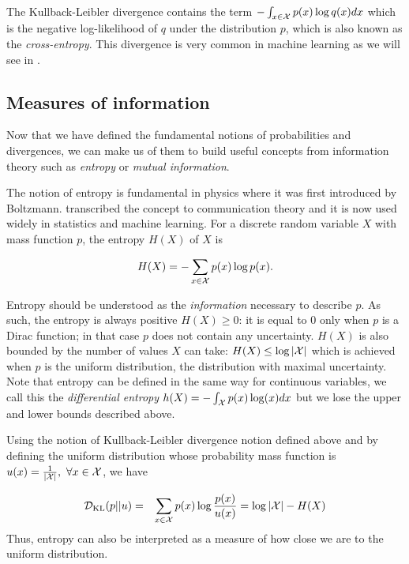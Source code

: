 The Kullback-Leibler divergence contains the term $-\int_{x \in {\mathcal{X}}}  p(x) \log q(x) dx$ which is the negative log-likelihood of $q$ under the distribution $p$, which is also known as the \emph{cross-entropy}. This divergence is very common in machine learning as we will see in .

\subsection{Measures of information}
Now that we have defined the fundamental notions of probabilities and divergences, we can make us of them to build useful concepts from information theory such as \emph{entropy} or \emph{mutual information}.


The notion of entropy is fundamental in physics where it was first introduced by Boltzmann. \citet{shannon1948mathematical} transcribed the concept to communication theory and it is now used widely in statistics and machine learning. For a discrete random variable $X$ with mass function $p$, the entropy $H(X)$ of $X$ is  

\begin{equation}
\label{eq:entropy}
    H(X) = - \sum_{x \in {\mathcal{X}}} p(x) \log p(x).
\end{equation}

Entropy should be understood as the \emph{information} necessary to describe $p$. As such, the entropy is always positive $H(X) \ge 0$: it is equal to $0$ only when $p$ is a Dirac function; in that case $p$ does not contain any uncertainty.
$H(X)$ is also bounded by the number of values $X$ can take: $H(X) \le \log | {\mathcal{X}} |$ which is achieved when $p$ is the uniform distribution, the distribution with maximal uncertainty. Note that entropy can be defined in the same way for continuous variables, we call this the \emph{differential entropy} $h(X) = - \int_{{\mathcal{X}}} p(x) \log (x) dx$ but we lose the upper and lower bounds described above.

Using the notion of Kullback-Leibler divergence notion defined above and by defining the uniform distribution whose probability mass function is $u(x) = \frac{1}{|{\mathcal{X}}|}, \ \forall x \in {\mathcal{X}}$, we have

\begin{eqnarray*}
    {\mathcal{D}}_{\mathrm{KL}}(p||u) &=& \sum_{x \in {\mathcal{X}}} p(x) \log \frac{p(x)}{u(x)} 
    =\log |{\mathcal{X}}| - H(X)
\end{eqnarray*}
Thus, entropy can also be interpreted as a measure of how close we are to the uniform distribution.

